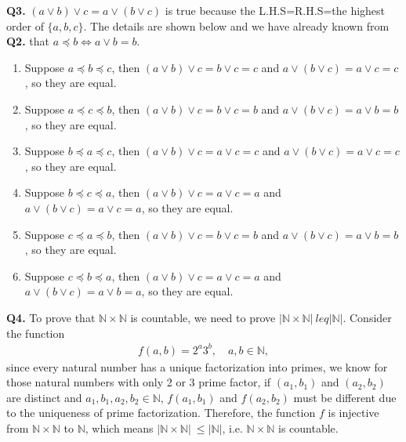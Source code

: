 \documentclass{article}[12pt]
\begin{document}
\noindent \textbf{Q3.}
$(a \vee b) \vee c=a \vee(b \vee c)$ is true because the L.H.S=R.H.S=the highest order of $\{a,b,c\}$. The details are shown below and we have already known from \textbf{Q2.} that $a\preceq b \Longleftrightarrow a\vee b=b$.
\begin{enumerate}
\item Suppose $a\preceq b \preceq c$, then $(a \vee b) \vee c=b\vee c=c$ and $a \vee(b \vee c)=a\vee c=c$, so they are equal. 
\item Suppose $a\preceq c \preceq b$, then $(a \vee b) \vee c=b\vee c=b$ and $a \vee(b \vee c)=a\vee b=b$, so they are equal. 
\item Suppose $b\preceq a \preceq c$, then $(a \vee b) \vee c=a\vee c=c$ and $a \vee(b \vee c)=a\vee c=c$, so they are equal. 
\item Suppose $b\preceq c \preceq a$, then $(a \vee b) \vee c=a\vee c=a$ and $a \vee(b \vee c)=a\vee c=a$, so they are equal. 
\item Suppose $c\preceq a \preceq b$, then $(a \vee b) \vee c=b\vee c=b$ and $a \vee(b \vee c)=a\vee b=b$, so they are equal. 
\item Suppose $c\preceq b \preceq a$, then $(a \vee b) \vee c=a\vee c=a$ and $a \vee(b \vee c)=a\vee b=a$, so they are equal. 
\end{enumerate}


\noindent \textbf{Q4.}
To prove that $\mathbb{N} \times \mathbb{N}$ is countable, we need to prove $|\mathbb{N} \times \mathbb{N}|\ leq |\mathbb{N}|$. Consider the function
\begin{align*}
f(a,b)=2^a3^b,\quad a,b\in\mathbb{N},
\end{align*}
since every natural number has a unique factorization into primes, we know for those natural numbers with only 2 or 3 prime factor, if $(a_1,b_1)$ and $(a_2,b_2)$ are distinct and $a_1,b_1,a_2,b_2\in\mathbb{N}$, $f(a_1,b_1)$ and $f(a_2,b_2)$ must be different due to the uniqueness of prime factorization. Therefore, the function $f$ is injective from $\mathbb{N} \times \mathbb{N}$ to $\mathbb{N}$, which means $|\mathbb{N} \times \mathbb{N}|\ \leq |\mathbb{N}|$, i.e. $\mathbb{N} \times \mathbb{N}$ is countable.\\
\end{document}
